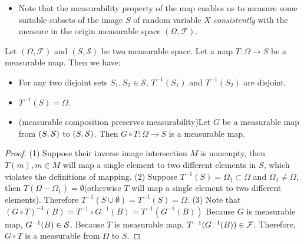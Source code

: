 \begin{refsection}
\begin{remark}[interpretation]\hfill
\begin{itemize}
	\item Note that the measurability property of the map enables us to measure some suitable subsets of the image $S$ of random variable $X$ \emph{consistently} with the measure in the origin measurable space $(\Omega,\mathcal{F})$.
\end{itemize}	
\end{remark}


\begin{lemma}\label{ch:theory-of-probability:th:BasicPropertiesOfMeasurableMap}
Let $(\Omega,\mathcal{F})$ and $(S,\mathcal{S})$ be two measurable space. Let a map $T:\Omega \rightarrow S$ be a measurable map. Then we have:
\begin{itemize}
	\item For any two disjoint sets $S_1,S_2 \in \mathcal{S}$, $T^{-1}(S_1)$ and $T^{-1}(S_2)$ are disjoint.
	\item $T^{-1}(S) = \Omega$.
	\item (measurable composition preserves measurability)Let $G$ be a measurable map from $(S,\mathcal{S})$ to $(S,\mathcal{S})$. Then $G\circ T: \Omega \to S$ is a measurable map.
\end{itemize}
\end{lemma}
\begin{proof}
(1) Suppose their inverse image intersection $M$ is nonempty, then $T(m),m\in M$ will map a single element to two different elements in $S$, which violates the definitions of mapping.
(2) Suppose $T^{-1}(S) = \Omega_1 \subset \Omega$ and $\Omega_1 \neq  \Omega$, then $T(\Omega - \Omega_1) = \emptyset$(otherwise $T$ will map a single element to two different elements). Therefore $T^{-1}(S\cup \emptyset) = T^{-1}(S) = \Omega$. (3) Note that $(G\circ T)^{-1}(B) = T^{-1}\circ G^{-1} (B) = T^{-1}( G^{-1} (B)) $
Because $G$ is measurable map, $G^{-1} (B) \in \mathcal{S}$. Because $T$ is measurable map, $T^{-1}( G^{-1} (B)) \in \mathcal{F}$. Therefore, $G\circ T$ is a measurable from $\Omega$ to $S$. 
\end{proof}


\end{refsection}
